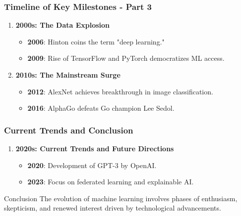 \documentclass{beamer}
\begin{document}
\begin{frame}[fragile]
    \frametitle{Timeline of Key Milestones - Part 3}
    \begin{enumerate}
        \item \textbf{2000s: The Data Explosion}
            \begin{itemize}
                \item \textbf{2006}: Hinton coins the term "deep learning."
                \item \textbf{2009}: Rise of TensorFlow and PyTorch democratizes ML access.
            \end{itemize}
        \item \textbf{2010s: The Mainstream Surge}
            \begin{itemize}
                \item \textbf{2012}: AlexNet achieves breakthrough in image classification.
                \item \textbf{2016}: AlphaGo defeats Go champion Lee Sedol.
            \end{itemize}
    \end{enumerate}
\end{frame}

\begin{frame}[fragile]
    \frametitle{Current Trends and Conclusion}
    \begin{enumerate}
        \item \textbf{2020s: Current Trends and Future Directions}
            \begin{itemize}
                \item \textbf{2020}: Development of GPT-3 by OpenAI.
                \item \textbf{2023}: Focus on federated learning and explainable AI.
            \end{itemize}
    \end{enumerate}
    \begin{block}{Conclusion}
        The evolution of machine learning involves phases of enthusiasm, skepticism, and renewed interest driven by technological advancements.
    \end{block}
\end{frame}
\end{document}
